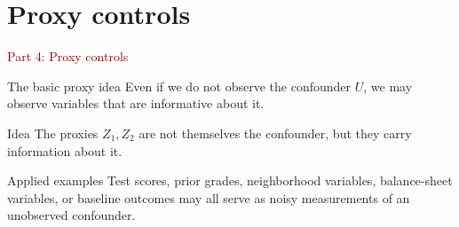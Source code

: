 \documentclass[dvipsnames,aspectratio=169,handout]{beamer}
\begin{document}

\section{Proxy controls}

\begin{frame}{}
\begin{center}
{\Huge \textcolor{DarkRed}{Part 4: Proxy controls}}
\end{center}
\end{frame}

\begin{frame}{The basic proxy idea}
Even if we do not observe the confounder $U$, we may observe variables that are informative about it.

\begin{center}
\end{center}

\begin{block}{Idea}
The proxies $Z_1,Z_2$ are not themselves the confounder, but they carry information about it.
\end{block}

\begin{alertblock}{Applied examples}
Test scores, prior grades, neighborhood variables, balance-sheet variables, or baseline outcomes may all serve as noisy measurements of an unobserved confounder.
\end{alertblock}
\end{frame}
\end{document}
